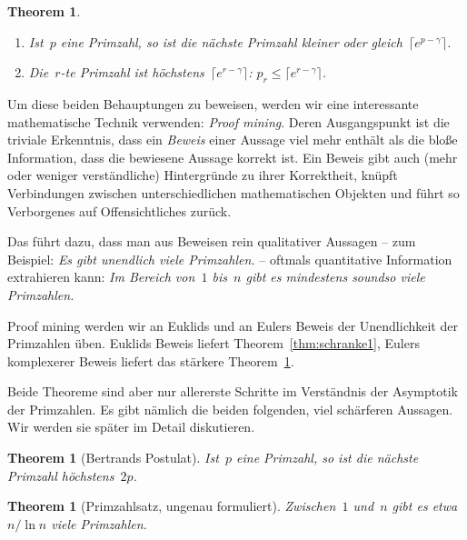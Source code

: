 \documentclass[twoside]{../zirkelblatt1415}
\theoremstyle{definition}
\theoremstyle{plain}
\newtheorem{thm}[defn]{Theorem}
\theoremstyle{remark}
\begin{document}
\begin{thm}\label{thm:schranke2}\ \\[-2em]
\begin{enumerate}
\item
Ist~$p$ eine Primzahl, so ist die nächste Primzahl kleiner oder gleich~$\lceil e^{p-\gamma}
\rceil$. \\[-2em]
\item
Die~$r$-te Primzahl ist höchstens~$\lceil e^{r-\gamma} \rceil$: $p_r
\leq \lceil e^{r-\gamma} \rceil$.
\end{enumerate}
\end{thm}

Um diese beiden Behauptungen zu beweisen, werden wir eine interessante
mathematische Technik verwenden: \emph{Proof mining}. Deren Ausgangspunkt ist
die triviale Erkenntnis, dass ein \emph{Beweis} einer Aussage viel mehr enthält
als die bloße Information, dass die bewiesene Aussage korrekt ist. Ein Beweis
gibt auch (mehr oder weniger verständliche) Hintergründe zu ihrer Korrektheit,
knüpft Verbindungen zwischen unterschiedlichen mathematischen Objekten und
führt so Verborgenes auf Offensichtliches zurück.

Das führt dazu, dass man aus Beweisen rein qualitativer Aussagen -- zum
Beispiel: \emph{Es gibt unendlich viele Primzahlen.} -- oftmals quantitative
Information extrahieren kann: \emph{Im Bereich von~$1$ bis~$n$ gibt es
mindestens soundso viele Primzahlen.}

Proof mining werden wir an Euklids und an Eulers Beweis der Unendlichkeit der
Primzahlen üben. Euklids Beweis liefert Theorem~\ref{thm:schranke1}, Eulers
komplexerer Beweis liefert das stärkere Theorem~\ref{thm:schranke2}.

Beide Theoreme sind aber nur allererste Schritte im Verständnis der Asymptotik
der Primzahlen. Es gibt nämlich die beiden folgenden, viel schärferen Aussagen.
Wir werden sie später im Detail diskutieren.

\begin{thm}[Bertrands Postulat]Ist~$p$ eine Primzahl, so ist die nächste
Primzahl höchstens~$2p$.
\end{thm}

\begin{thm}[Primzahlsatz, ungenau formuliert]Zwischen~$1$ und~$n$ gibt es
etwa~$n/\ln n$ viele Primzahlen.\end{thm}
\end{document}
